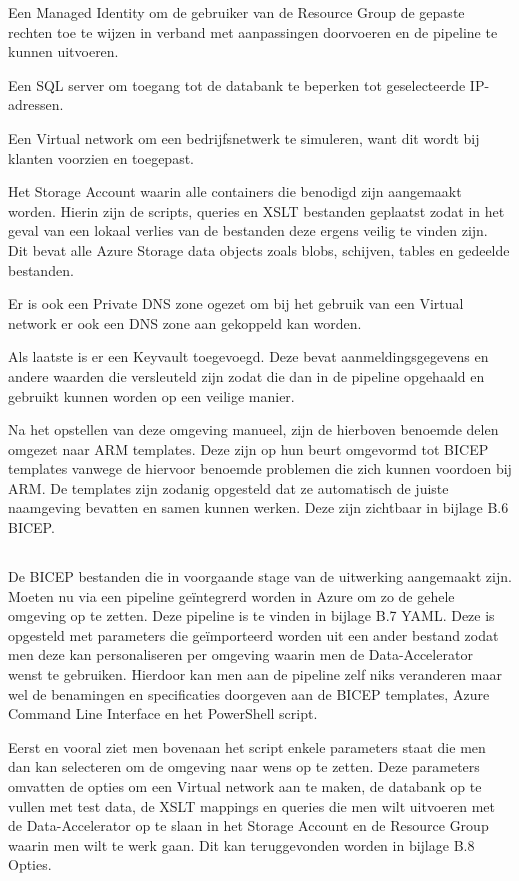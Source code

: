 Een Managed Identity om de gebruiker van de Resource Group de gepaste rechten toe te wijzen in verband met aanpassingen doorvoeren en de pipeline te kunnen uitvoeren.

Een SQL server om toegang tot de databank te beperken tot geselecteerde IP-adressen.

Een Virtual network om een bedrijfsnetwerk te simuleren, want dit wordt bij klanten voorzien en toegepast.

Het Storage Account waarin alle containers die benodigd zijn aangemaakt worden. Hierin zijn de scripts, queries en XSLT bestanden geplaatst zodat in het geval van een lokaal verlies van de bestanden deze ergens veilig te vinden zijn. Dit bevat alle Azure Storage data objects zoals blobs, schijven, tables en gedeelde bestanden.

Er is ook een Private DNS zone ogezet om bij het gebruik van een Virtual network er ook een DNS zone aan gekoppeld kan worden.

Als laatste is er een Keyvault toegevoegd. Deze bevat aanmeldingsgegevens en andere waarden die versleuteld zijn zodat die dan in de pipeline opgehaald en gebruikt kunnen worden op een veilige manier.

Na het opstellen van deze omgeving manueel, zijn de hierboven benoemde delen omgezet naar ARM templates. Deze zijn op hun beurt omgevormd tot BICEP templates vanwege de hiervoor benoemde problemen die zich kunnen voordoen bij ARM. De templates zijn zodanig opgesteld dat ze automatisch de juiste naamgeving bevatten en samen kunnen werken. Deze zijn zichtbaar in bijlage B.6 BICEP.

\subsection{}%
\label{sec:Pipeline}

De BICEP bestanden die in voorgaande stage van de uitwerking aangemaakt zijn. Moeten nu via een pipeline geïntegrerd worden in Azure om zo de gehele omgeving op te zetten. Deze pipeline is te vinden in bijlage B.7 YAML. Deze is opgesteld met parameters die geïmporteerd worden uit een ander bestand zodat men deze kan personaliseren per omgeving waarin men de Data-Accelerator wenst te gebruiken. Hierdoor kan men aan de pipeline zelf niks veranderen maar wel de benamingen en specificaties doorgeven aan de BICEP templates, Azure Command Line Interface en het PowerShell script.

Eerst en vooral ziet men bovenaan het script enkele parameters staat die men dan kan selecteren om de omgeving naar wens op te zetten. Deze parameters omvatten de opties om een Virtual network aan te maken, de databank op te vullen met test data, de XSLT mappings en queries die men wilt uitvoeren met de Data-Accelerator op te slaan in het Storage Account en de Resource Group waarin men wilt te werk gaan. Dit kan teruggevonden worden in bijlage B.8 Opties.

